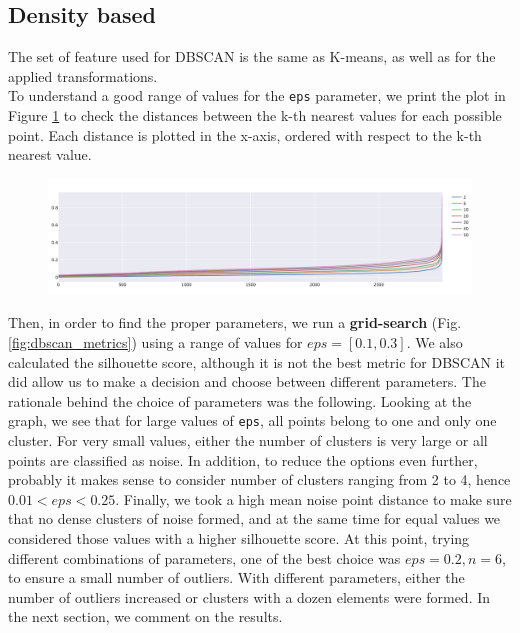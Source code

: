\subsection{Density based}
The set of feature used for DBSCAN is the same as K-means, as well as for the applied transformations.\\
To understand a good range of values for the \verb|eps| parameter, we print the plot in Figure \ref{fig:dbscan_distances} to check the distances between the k-th nearest values for each possible point. Each distance is plotted in the x-axis, ordered with respect to the k-th nearest value.
\begin{figure}[h]
	\centering
	\includegraphics[width=\textwidth]{plots/dbscan/dbscan_distances}
	\label{fig:dbscan_distances}
\end{figure}

Then, in order to find the proper parameters, we run a \textbf{grid-search} (Fig. \ref{fig:dbscan_metrics}) using a range of values for $eps=[0.1, 0.3]$. We also calculated the silhouette score, although it is not the best metric for DBSCAN it did allow us to make a decision and choose between different parameters. The rationale behind the choice of parameters was the following. Looking at the graph, we see that for large values of \verb|eps|, all points belong to one and only one cluster. For very small values, either the number of clusters is very large or all points are classified as noise. In addition, to reduce the options even further, probably it makes sense to consider number of clusters ranging from 2 to 4, hence $0.01 < eps < 0.25$. Finally, we took a high mean noise point distance to make sure that no dense clusters of noise formed, and at the same time for equal values we considered those values with a higher silhouette score. At this point, trying different combinations of parameters, one of the best choice was $eps=0.2, n=6$, to ensure a small number of outliers. With different parameters, either the number of outliers increased or clusters with a dozen elements were formed. In the next section, we comment on the results.

